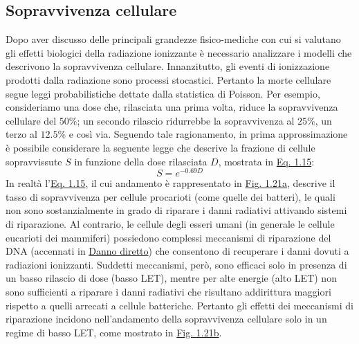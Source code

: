 \documentclass[12pt,a4paper,twoside]{report}
\begin{document}
	\subsection{Sopravvivenza cellulare}\label{sec:sopravvivenza_cellulare}
	Dopo aver discusso delle principali grandezze fisico-mediche con cui si valutano gli effetti biologici della radiazione ionizzante è necessario analizzare i modelli che descrivono la sopravvivenza cellulare. Innanzitutto, gli eventi di ionizzazione prodotti dalla radiazione sono processi stocastici. Pertanto la morte cellulare segue leggi probabilistiche dettate dalla statistica di Poisson. Per esempio, consideriamo una dose che, rilasciata una prima volta, riduce la sopravvivenza cellulare del $50\%$; un secondo rilascio ridurrebbe la sopravvivenza al $25\%$, un terzo al $12.5\%$ e così via. Seguendo tale ragionamento, in prima approssimazione è possibile considerare la seguente legge che descrive la frazione di cellule sopravvissute $S$ in funzione della dose rilasciata $D$, mostrata in \hyperref[eq:survival1]{Eq. 1.15}:
	\begin{equation}
		S=e^{-0.69D}
		\label{eq:survival1}
	\end{equation}
	In realtà l'\hyperref[eq:survival1]{Eq. 1.15}, il cui andamento è rappresentato in \hyperref[fig:survival1]{Fig. 1.21a}, descrive il tasso di sopravvivenza per cellule procarioti (come quelle dei batteri), le quali non sono sostanzialmente in grado di riparare i danni radiativi attivando sistemi di riparazione. Al contrario, le cellule degli esseri umani (in generale le cellule eucarioti dei mammiferi) possiedono complessi meccanismi di riparazione del DNA (accennati in \hyperref[par:danno_diretto]{Danno diretto}) che consentono di recuperare i danni dovuti a radiazioni ionizzanti. Suddetti meccanismi, però, sono efficaci solo in presenza di un basso rilascio di dose (basso LET), mentre per alte energie (alto LET) non sono sufficienti a riparare i danni radiativi che risultano addirittura maggiori rispetto a quelli arrecati a cellule batteriche. Pertanto gli effetti dei meccanismi di riparazione incidono nell'andamento della sopravvivenza cellulare solo in un regime di basso LET, come mostrato in \hyperref[fig:survival2]{Fig. 1.21b}.
	
\end{document}
